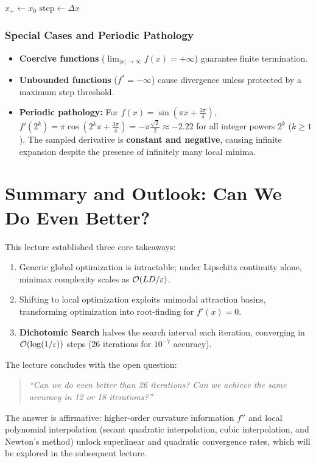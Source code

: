 \begin{algorithm}[H]
\caption{Bracketing Procedure via Geometric Expansion}
\label{alg:bracketing-expansion-en}

$x_+ \gets x_0$\;
$\text{step} \gets \Delta x$\;
\;
\end{algorithm}

\subsubsection{Special Cases and Periodic Pathology}
\begin{itemize}
    \item \textbf{Coercive functions} ($\lim_{|x| \to \infty} f(x) = +\infty$) guarantee finite termination.
    \item \textbf{Unbounded functions} ($f^* = -\infty$) cause divergence unless protected by a maximum step threshold.
    \item \textbf{Periodic pathology:} For $f(x) = \sin(\pi x + \frac{3\pi}{4})$, $f'(2^k) = \pi \cos(2^k \pi + \frac{3\pi}{4}) = -\pi \frac{\sqrt{2}}{2} \approx -2.22$ for all integer powers $2^k$ ($k \ge 1$). The sampled derivative is \textbf{constant and negative}, causing infinite expansion despite the presence of infinitely many local minima.
\end{itemize}

\FloatBarrier
\section{Summary and Outlook: Can We Do Even Better?}
\label{sec:univariate-outlook-en}

This lecture established three core takeaways:
\begin{enumerate}
    \item Generic global optimization is intractable; under Lipschitz continuity alone, minimax complexity scales as $\mathcal{O}\!\left(LD/\varepsilon\right)$.
    \item Shifting to local optimization exploits unimodal attraction basins, transforming optimization into root-finding for $f'(x) = 0$.
    \item \textbf{Dichotomic Search} halves the search interval each iteration, converging in $\mathcal{O}\!\left(\log(1/\varepsilon)\right)$ steps (26 iterations for $10^{-7}$ accuracy).
\end{enumerate}

The lecture concludes with the open question:
\begin{quote}
\textit{``Can we do even better than 26 iterations? Can we achieve the same accuracy in 12 or 18 iterations?''}
\end{quote}
The answer is affirmative: higher-order curvature information $f''$ and local polynomial interpolation (secant quadratic interpolation, cubic interpolation, and Newton's method) unlock superlinear and quadratic convergence rates, which will be explored in the subsequent lecture.
